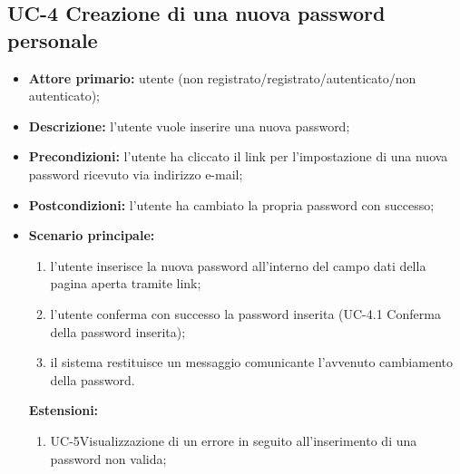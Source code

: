 \subsection{UC-4 Creazione di una nuova password personale}
\begin{itemize}
	\item \textbf{Attore primario:} utente (non registrato/registrato/autenticato/non autenticato);

	\item \textbf{Descrizione:} l'utente vuole inserire una nuova password;

	\item \textbf{Precondizioni:} l'utente ha cliccato il link per l'impostazione di una nuova password ricevuto via indirizzo e-mail;

	\item \textbf{Postcondizioni:} l'utente ha cambiato la propria password con successo;

	\item \textbf{Scenario principale:}
	\begin{enumerate}
    	\item l'utente inserisce la nuova password all'interno del campo dati della pagina aperta tramite link;
   		\item l'utente conferma con successo la password inserita (UC-4.1 Conferma della password inserita);
    	\item il sistema restituisce un messaggio comunicante l'avvenuto cambiamento della password.
	\end{enumerate}

	\textbf{Estensioni:}
	\begin{enumerate}
   		\item UC-5Visualizzazione di un errore in seguito all'inserimento di una password non valida;
	\end{enumerate}
\end{itemize}

